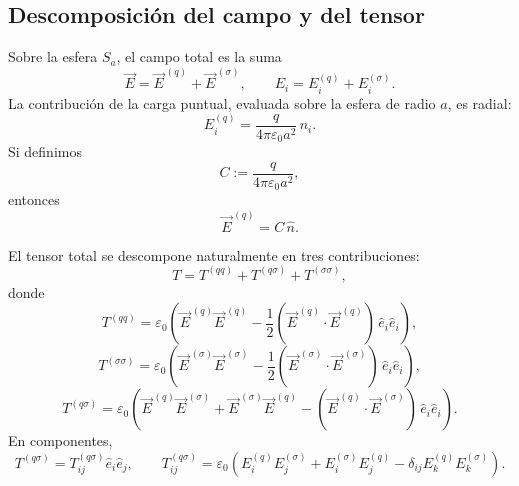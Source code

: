 \documentclass{article}
\numberwithin{equation}{section}
\newcommand{\Etot}{\vec E}
\newcommand{\Eself}{\vec E^{\,(q)}}
\newcommand{\Eext}{\vec E^{\,(\sigma)}}
\begin{document}
\subsection{Descomposición del campo y del tensor}

Sobre la esfera $S_a$, el campo total es la suma
\begin{equation}
    \Etot=\Eself+\Eext,
    \qquad
    E_i=E_i^{(q)}+E_i^{(\sigma)}.
\end{equation}
La contribución de la carga puntual, evaluada sobre la esfera de radio $a$, es radial:
\begin{equation}
    E_i^{(q)}=\frac{q}{4\pi\varepsilon_0a^2}\,n_i.
\end{equation}
Si definimos
\begin{equation}
    C:=\frac{q}{4\pi\varepsilon_0a^2},
\end{equation}
entonces
\begin{equation}
    \Eself=C\,\hat n.
\end{equation}

El tensor total se descompone naturalmente en tres contribuciones:
\begin{equation}
    T=T^{(qq)}+T^{(q\sigma)}+T^{(\sigma\sigma)},
\end{equation}
donde
\begin{equation}
    T^{(qq)}=\varepsilon_0\left(\Eself\Eself-\frac12(\Eself\cdot\Eself)\,\hat e_i\hat e_i\right),
\end{equation}
\begin{equation}
    T^{(\sigma\sigma)}=\varepsilon_0\left(\Eext\Eext-\frac12(\Eext\cdot\Eext)\,\hat e_i\hat e_i\right),
\end{equation}
\begin{equation}
    T^{(q\sigma)}=\varepsilon_0\left(\Eself\Eext+\Eext\Eself-(\Eself\cdot\Eext)\,\hat e_i\hat e_i\right).
\end{equation}
En componentes,
\begin{equation}
    T^{(q\sigma)}=T_{ij}^{(q\sigma)}\hat e_i\hat e_j,
    \qquad
    T_{ij}^{(q\sigma)}=\varepsilon_0\left(E_i^{(q)}E_j^{(\sigma)}+E_i^{(\sigma)}E_j^{(q)}-\delta_{ij}E_k^{(q)}E_k^{(\sigma)}\right).
\end{equation}
\end{document}
